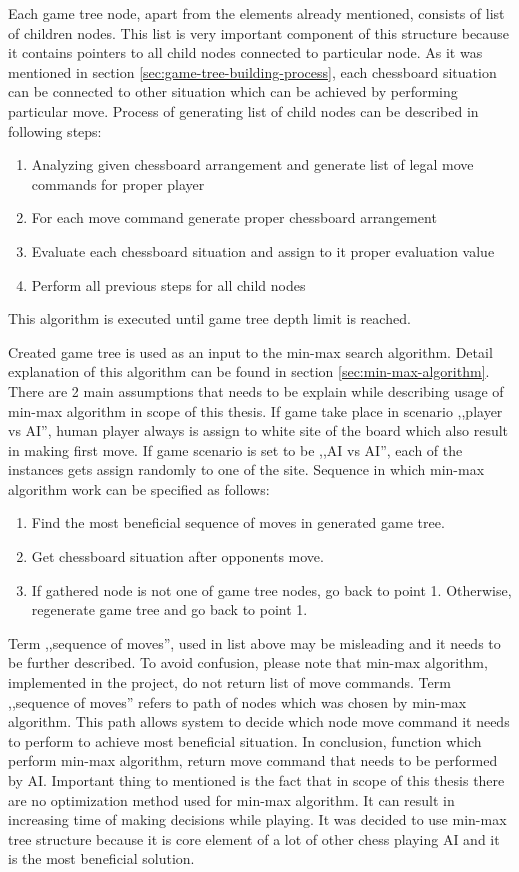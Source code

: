 Each game tree node, apart from the elements already mentioned, consists of list of children nodes. This list is very important component of this structure because it contains pointers to all child nodes connected to particular node. As it was mentioned in section \ref{sec:game-tree-building-process}, each chessboard situation can be connected to other situation which can be achieved by performing particular move. Process of generating list of child nodes can be described in following steps:
\begin{enumerate}
	\item Analyzing given chessboard arrangement and generate list of legal move commands for proper player
	\item For each move command generate proper chessboard arrangement
	\item Evaluate each chessboard situation and assign to it proper evaluation value
	\item Perform all previous steps for all child nodes
\end{enumerate}
This algorithm is executed until game tree depth limit is reached.

Created game tree is used as an input to the min-max search algorithm. Detail explanation of this algorithm can be found in section \ref{sec:min-max-algorithm}. There are 2 main assumptions that needs to be explain while describing usage of min-max algorithm in scope of this thesis. If game take place in scenario ,,player vs AI'', human player always is assign to white site of the board which also result in making first move. If game scenario is set to be ,,AI vs AI'', each of the instances gets assign randomly to one of the site. Sequence in which min-max algorithm work can be specified as follows:
\begin{enumerate}
	\item Find the most beneficial sequence of moves in generated game tree.
	\item Get chessboard situation after opponents move.
	\item If gathered node is not one of game tree nodes, go back to point 1. Otherwise, regenerate game tree and go back to point 1.
\end{enumerate}
Term ,,sequence of moves'', used in list above may be misleading and it needs to be further described. To avoid confusion, please note that min-max algorithm, implemented in the project, do not return list of move commands. Term ,,sequence of moves'' refers to path of nodes which was chosen by min-max algorithm. This path allows system to decide which node move command it needs to perform to achieve most beneficial situation. In conclusion, function which perform min-max algorithm, return move command that needs to be performed by AI. Important thing to mentioned is the fact that in scope of this thesis there are no optimization method used for min-max algorithm. It can result in increasing time of making decisions while playing. It was decided to use min-max tree structure because it is core element of a lot of other chess playing AI and it is the most beneficial solution. 

